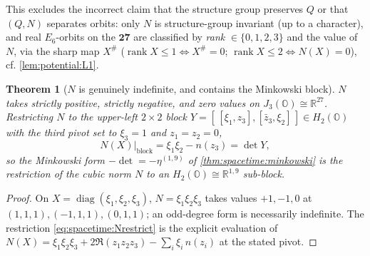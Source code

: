 \documentclass[11pt]{article}
\theoremstyle{plain}
\newtheorem{theorem}{Theorem}[section]
\theoremstyle{definition}
\theoremstyle{remark}
\newcommand{\rank}{\operatorname{rank}}
\newcommand{\diag}{\operatorname{diag}}
\begin{document}
This excludes the incorrect claim that the structure group preserves $Q$ or that
$(Q,N)$ separates orbits: only $N$ is structure-group invariant (up to a character),
and real $E_6$-orbits on the $\mathbf{27}$ are classified by \emph{rank}
$\in\{0,1,2,3\}$ and the value of $N$, via the sharp map $X^\#$
($\rank X\le1\Leftrightarrow X^\#=0$; $\rank X\le2\Leftrightarrow N(X)=0$), cf.
\autoref{lem:potential:L1}.

\begin{theorem}[$N$ is genuinely indefinite, and contains the Minkowski block]
\label{thm:spacetime:Nindef}
$N$ takes strictly positive, strictly negative, and zero values on
$J_3(\mathbb O)\cong\mathbb R^{27}$. Restricting $N$ to the upper-left $2\times2$ block
$Y=[\,[\xi_1,z_3],[\bar z_3,\xi_2]\,]\in H_2(\mathbb O)$ with the third pivot set to
$\xi_3=1$ and $z_1=z_2=0$,
\begin{equation}\label{eq:spacetime:Nrestrict}
  N(X)\big|_{\mathrm{block}}=\xi_1\xi_2-n(z_3)=\det Y,
\end{equation}
so the Minkowski form $-\det=-\eta^{(1,9)}$ of \autoref{thm:spacetime:minkowski} is the
restriction of the cubic norm $N$ to an $H_2(\mathbb O)\cong\mathbb R^{1,9}$ sub-block.
\end{theorem}
\begin{proof}
On $X=\diag(\xi_1,\xi_2,\xi_3)$, $N=\xi_1\xi_2\xi_3$ takes values $+1,-1,0$ at
$(1,1,1),(-1,1,1),(0,1,1)$; an odd-degree form is necessarily indefinite. The
restriction \eqref{eq:spacetime:Nrestrict} is the explicit evaluation of
$N(X)=\xi_1\xi_2\xi_3+2\Re(z_1z_2z_3)-\sum_i\xi_i\,n(z_i)$ at the stated pivot.
\end{proof}
\end{document}

